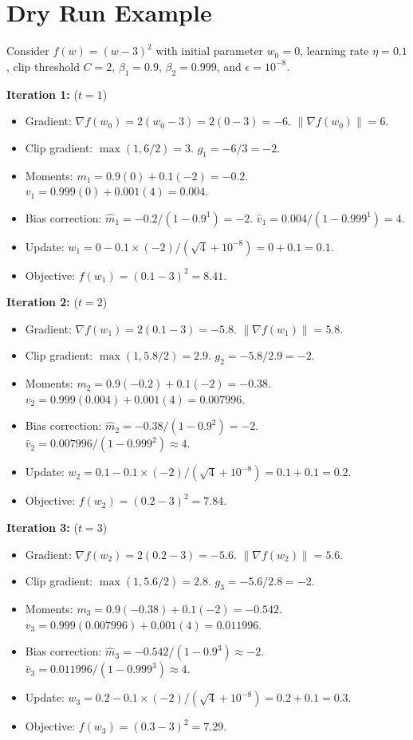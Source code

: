 \documentclass{article}
\begin{document}
\section*{Dry Run Example}

Consider $f(w) = (w-3)^2$ with initial parameter $w_0 = 0$, learning rate $\eta = 0.1$, clip threshold $C = 2$, $\beta_1 = 0.9$, $\beta_2 = 0.999$, and $\epsilon = 10^{-8}$.

\textbf{Iteration 1:} ($t=1$)
\begin{itemize}
    \item Gradient: $\nabla f(w_0) = 2(w_0 - 3) = 2(0 - 3) = -6$. $\|\nabla f(w_0)\| = 6$.
    \item Clip gradient: $\max(1, 6/2) = 3$. $g_1 = -6 / 3 = -2$.
    \item Moments: $m_1 = 0.9(0) + 0.1(-2) = -0.2$. $v_1 = 0.999(0) + 0.001(4) = 0.004$.
    \item Bias correction: $\hat{m}_1 = -0.2 / (1 - 0.9^1) = -2$. $\hat{v}_1 = 0.004 / (1 - 0.999^1) = 4$.
    \item Update: $w_1 = 0 - 0.1 \times (-2) / (\sqrt{4} + 10^{-8}) = 0 + 0.1 = 0.1$.
    \item Objective: $f(w_1) = (0.1 - 3)^2 = 8.41$.
\end{itemize}

\textbf{Iteration 2:} ($t=2$)
\begin{itemize}
    \item Gradient: $\nabla f(w_1) = 2(0.1 - 3) = -5.8$. $\|\nabla f(w_1)\| = 5.8$.
    \item Clip gradient: $\max(1, 5.8/2) = 2.9$. $g_2 = -5.8 / 2.9 = -2$.
    \item Moments: $m_2 = 0.9(-0.2) + 0.1(-2) = -0.38$. $v_2 = 0.999(0.004) + 0.001(4) = 0.007996$.
    \item Bias correction: $\hat{m}_2 = -0.38 / (1 - 0.9^2) = -2$. $\hat{v}_2 = 0.007996 / (1 - 0.999^2) \approx 4$.
    \item Update: $w_2 = 0.1 - 0.1 \times (-2) / (\sqrt{4} + 10^{-8}) = 0.1 + 0.1 = 0.2$.
    \item Objective: $f(w_2) = (0.2 - 3)^2 = 7.84$.
\end{itemize}

\textbf{Iteration 3:} ($t=3$)
\begin{itemize}
    \item Gradient: $\nabla f(w_2) = 2(0.2 - 3) = -5.6$. $\|\nabla f(w_2)\| = 5.6$.
    \item Clip gradient: $\max(1, 5.6/2) = 2.8$. $g_3 = -5.6 / 2.8 = -2$.
    \item Moments: $m_3 = 0.9(-0.38) + 0.1(-2) = -0.542$. $v_3 = 0.999(0.007996) + 0.001(4) = 0.011996$.
    \item Bias correction: $\hat{m}_3 = -0.542 / (1 - 0.9^3) \approx -2$. $\hat{v}_3 = 0.011996 / (1 - 0.999^3) \approx 4$.
    \item Update: $w_3 = 0.2 - 0.1 \times (-2) / (\sqrt{4} + 10^{-8}) = 0.2 + 0.1 = 0.3$.
    \item Objective: $f(w_3) = (0.3 - 3)^2 = 7.29$.
\end{itemize}
\end{document}
